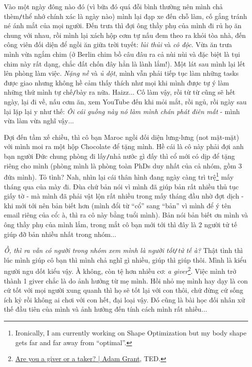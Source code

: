 \documentclass[12pt]{article}
\numberwithin{equation}{section}
\begin{document}
\noindent
{} Vào một ngày đông nào đó (vì bữa đó quá đỗi bình thường nên mình chả thèm\texttt{/}thể nhớ chính xác là ngày nào) mình lại đạp xe đến chỗ làm, cố gắng tránh né ánh mắt của mọi người. Đến trưa thì đợi ông thầy phụ của mình đi rủ họ ăn chung với nhau, rồi mình lại xách hộp cơm tự nấu đem theo ra khỏi tòa nhà, đến công viên đối diện để ngồi ăn giữa trời tuyết: \textit{lủi thủi} và \textit{cô độc}. Vừa ăn trưa mình vừa ngắm chim (ở Berlin chim bồ câu đâu ra cả nùi nùi và đặc biệt là tụi chim này rất dạng, chắc đất chốn đây hẳn là lành lắm!). Một lát sau mình lại lết lên phòng làm việc. \textit{Nặng nề} và \textit{ủ dột}, mình vẫn phải tiếp tục làm những tasks được giao nhưng không hề cảm thấy thích như mọi khi mình được tự ý làm những thứ mình tự chế\texttt{/}bày ra nữa. Haizz$\ldots$ Cố làm vậy, rồi từ từ cũng sẽ hết ngày, lại đi về, nấu cơm ăn, xem YouTube đến khi mỏi mắt, rồi ngủ, rồi ngày sau lại lặp lại y như thế: \textit{Ôi cái guồng này nó làm mình chán phát điên mất} - mình vừa làm vừa nghĩ vậy$\ldots$

Đợi đến tầm xế chiều, thì cô bạn Maroc ngồi đối diện lưng-lưng (not mặt-mặt) với mình moi ra một hộp Chocolate để tặng mình. Hề cái là cô này phải đợi anh bạn người Đức chung phòng đi lấy\texttt{/}nhả nước gì đấy thì cổ mới có dịp để tặng riêng cho mình (phòng mình là phòng toàn PhDs duy nhất của cả nhóm, gồm 3 đứa mình). Tỏ tình? Nah, nhìn lại cái thân hình đang ngày càng trì trệ\footnote{Ironically, I am currently working on Shape Optimization but my body shape gets far and far away from ``optimal''.} mấy tháng qua của mày đi. Đùa chứ bản nói vì mình đã giúp bản rất nhiều thủ tục giấy tờ - mà mình đã phải vật lộn rất nhiều trong mấy tháng đầu nhờ đợt dịch - khi mới tới nên bản biết hơn (mình đổi từ ``cổ'' sang ``bản'' vì mình để ý tên email riêng của cổ: à, thì ra cô này bằng tuổi mình). Bản nói bản biết ơn mình và ông thầy phụ của mình lắm, trong mắt cô bạn mới tới thì đây là 2 người tử tế giúp đỡ bản nhiều nhất trong nhóm$\ldots$

\textit{Ồ, thì ra vẫn có người trong nhóm xem mình là người tốt\texttt{/}tử tế à?} Thật tình thì lúc mình giúp cô bạn thì mình chả nghĩ gì nhiều, giúp thì giúp thôi. Mình là kiểu người ngu dốt kiểu vậy. À không, còn tệ hơn nhiều cơ: \textit{a giver}\footnote{\href{https://www.youtube.com/watch?v=YyXRYgjQXX0}{Are you a giver or a taker? | Adam Grant}, TED.}. Việc mình trở thành 1 giver chắc là do ảnh hưởng từ mẹ mình. Hồi nhỏ mẹ mình hay dạy là con cứ tốt với mọi người xung quanh thì họ sẽ tốt lại với con thôi, chứ đừng cứ sống ích kỷ rồi không ai chơi với con hết, đại loại vậy. Đó cũng là bài học đối nhân xử thế đầu tiên của mình và ảnh hưởng đến tính cách mình rất nhiều$\ldots$
\end{document}
